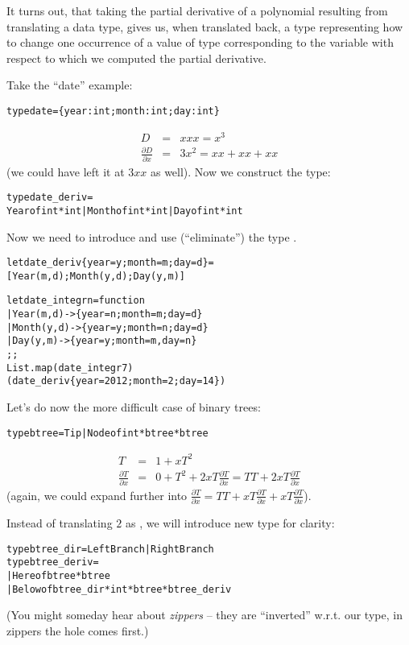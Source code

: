 \documentclass{article}
\newcommand{\tmem}[1]{{\em #1\/}}
\newcommand{\tmverbatim}[1]{\text{{\ttfamily{#1}}}}
\newenvironment{tmcode}[1][]{\begin{alltt} }{\end{alltt}}
\begin{document}
It turns out, that taking the partial derivative of a polynomial resulting
from translating a data type, gives us, when translated back, a type
representing how to change one occurrence of a value of type corresponding to
the variable with respect to which we computed the partial derivative.

Take the ``date'' example:
\begin{tmcode}
type date = \{year: int; month: int; day: int\}
\end{tmcode}
\begin{eqnarray*}
  D & = & xxx = x^3\\
  \frac{\partial D}{\partial x} & = & 3 x^2 = xx + xx + xx
\end{eqnarray*}
(we could have left it at $3 xx$ as well). Now we construct the type:
\begin{tmcode}
type date_deriv =
  Year of int * int | Month of int * int | Day of int * int
\end{tmcode}
Now we need to introduce and use (``eliminate'') the type
\tmverbatim{date\_deriv}.
\begin{tmcode}
let date_deriv \{year=y; month=m; day=d\} =
  [Year (m, d); Month (y, d); Day (y, m)]

let date_integr n = function
  | Year (m, d) -> \{year=n; month=m; day=d\}
  | Month (y, d) -> \{year=y; month=n; day=d\}
  | Day (y, m) -> \{year=y; month=m, day=n\}
;;
List.map (date_integr 7)
  (date_deriv \{year=2012; month=2; day=14\})
\end{tmcode}
{\newpage}

Let's do now the more difficult case of binary trees:
\begin{tmcode}
type btree = Tip | Node of int * btree * btree
\end{tmcode}
\begin{eqnarray*}
  T & = & 1 + xT^2\\
  \frac{\partial T}{\partial x} & = & 0 + T^2 + 2 xT \frac{\partial
  T}{\partial x} = TT + 2 xT \frac{\partial T}{\partial x}
\end{eqnarray*}
(again, we could expand further into $\frac{\partial T}{\partial x} = TT + xT
\frac{\partial T}{\partial x} + xT \frac{\partial T}{\partial x}$).

Instead of translating $2$ as \tmverbatim{bool}, we will introduce new type
for clarity:
\begin{tmcode}
type btree_dir = LeftBranch | RightBranch
type btree_deriv =
  | Here of btree * btree
  | Below of btree_dir * int * btree * btree_deriv
\end{tmcode}
(You might someday hear about {\tmem{zippers}} -- they are ``inverted'' w.r.t.
our type, in zippers the hole comes first.)
\end{document}
